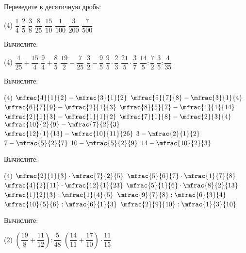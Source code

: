 \begin{class}[number=2]
	\begin{listofex}
		\item Переведите в десятичную дробь:
		\begin{tasks}(4)
			\task \( \dfrac{1}{4} \)
			\task \( \dfrac{2}{5} \)
			\task \( \dfrac{3}{8} \)
			\task \( \dfrac{8}{25} \)
			\task \( \dfrac{15}{10} \)
			\task \( \dfrac{1}{100} \)
			\task \( \dfrac{3}{200} \)
			\task \( \dfrac{7}{500} \)
		\end{tasks}
		\item Вычислите:
		\begin{tasks}(4)
			\task \( \dfrac{4}{25}+\dfrac{15}{4} \)
			\task \( \dfrac{9}{4}+\dfrac{8}{5} \)
			\task \( \dfrac{19}{2}-\dfrac{7}{25} \)
			\task \( \dfrac{3}{2}-\dfrac{9}{5} \)
			\task \( \dfrac{9}{5}\cdot\dfrac{2}{3} \)
			\task \( \dfrac{21}{5}\cdot\dfrac{3}{7} \)
			\task \( \dfrac{14}{5}:\dfrac{7}{2} \)
			\task \( \dfrac{3}{5}:\dfrac{4}{35} \)
		\end{tasks}
		\item Вычислите:
		\begin{tasks}(4)
			\task \( \mfrac{4}{1}{2}-\mfrac{3}{1}{2} \)
			\task \( \mfrac{5}{7}{8}-\mfrac{3}{1}{4} \)
			\task \( \mfrac{6}{7}{9}-\mfrac{2}{1}{3} \)
			\task \( \mfrac{8}{5}{7}-\mfrac{1}{1}{14} \)
			\task \( \mfrac{2}{1}{3}-\mfrac{1}{1}{2} \)
			\task \( \mfrac{7}{1}{8}-\mfrac{2}{3}{4} \)
			\task \( \mfrac{10}{2}{9}-\mfrac{7}{2}{3} \)
			\task \( \mfrac{12}{1}{13}-\mfrac{10}{11}{26} \)
			\task \( 3-\mfrac{2}{1}{2} \)
			\task \( 7-\mfrac{5}{2}{7} \)
			\task \( 10-\mfrac{5}{2}{9} \)
			\task \( 14-\mfrac{10}{2}{3} \)
		\end{tasks}
		\item Вычислите:
		\begin{tasks}(4)
			\task \( \mfrac{2}{1}{3}\cdot\mfrac{7}{2}{5} \)
			\task \( \mfrac{5}{6}{7}\cdot\mfrac{1}{7}{8} \)
			\task \( \mfrac{4}{2}{11}\cdot\mfrac{12}{1}{23} \)
			\task \( \mfrac{5}{1}{6}\cdot\mfrac{8}{2}{13} \)
			\task \( \mfrac{1}{2}{3}:\mfrac{1}{4}{5} \)
			\task \( \mfrac{9}{7}{8}:\mfrac{6}{3}{4} \)
			\task \( \mfrac{10}{5}{6}:\mfrac{6}{1}{3} \)
			\task \( \mfrac{2}{9}{10}:\mfrac{1}{3}{10} \)
		\end{tasks}
		\item Вычислите:
		\begin{tasks}(2)
			\task \( \left( \dfrac{19}{8}+\dfrac{11}{12} \right):\dfrac{5}{48} \)
			\task \( \left( \dfrac{14}{11}+\dfrac{17}{10} \right)\cdot\dfrac{11}{15} \)

\end{tasks}
\end{listofex}
\end{class}

